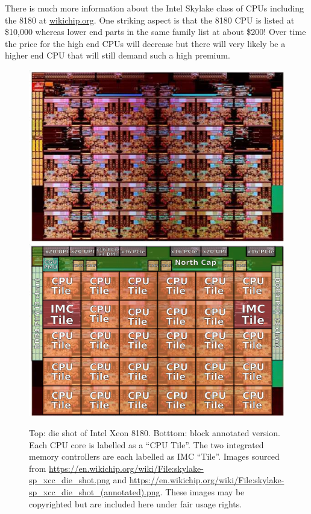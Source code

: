 There is much more information about the Intel Skylake class of CPUs including the 8180 at \href{https://en.wikichip.org/wiki/intel/microarchitectures/skylake_(server)}{wikichip.org}. One striking aspect is that the 8180 CPU is listed at \$10,000 whereas lower end parts in the same family list at about \$200! Over time the price for the high end CPUs will decrease but there will very likely be a higher end CPU that will still demand such a high premium. 

\begin{figure}
    \begin{center}
    \includegraphics[width=0.8\linewidth]{figures/L14/skylakespxccdieshot.png}
    \includegraphics[width=0.8\linewidth]{figures/L14/skylakespxccdieshotannotated.png}
    \end{center}
    \caption{Top: die shot of Intel Xeon 8180. Botttom: block annotated version. Each CPU core is  labelled as a ``CPU Tile''. The two integrated memory controllers are each labelled as IMC ``Tile''.  Images sourced from \href{https://en.wikichip.org/wiki/File:skylake-sp_xcc_die_shot.png}{https://en.wikichip.org/wiki/File:skylake-sp\_xcc\_die\_shot.png} and \href{https://en.wikichip.org/wiki/File:skylake-sp_xcc_die_shot_(annotated).png}{https://en.wikichip.org/wiki/File:skylake-sp\_xcc\_die\_shot\_(annotated).png}. These images may be copyrighted but are included here under fair usage rights. }
    \label{skylakeDieshot.fig}
\end{figure}


